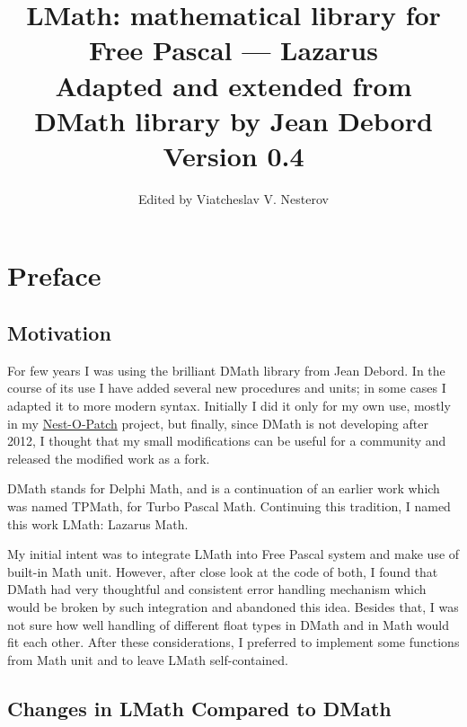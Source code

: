 \documentclass[12pt,a4paper,oneside]{report}
\begin{document}
\title{LMath: mathematical library for Free Pascal --- Lazarus\\
{\large Adapted and extended from DMath library by Jean Debord\\
Version 0.4}}

\author{Edited by Viatcheslav V. Nesterov}
\maketitle
\newpage
\label{toc}\tableofcontents
\newpage
\newlength{\tmplength}
\chapter*{Preface}
\section*{Motivation}
For few years I was using the brilliant DMath library from Jean Debord. In the course of its use I have added several new procedures and units; in some cases I adapted it to more modern syntax. Initially I did it only for my own use, mostly in my \href{https://sourceforge.net/projects/nestopatch/}{Nest-O-Patch} project, but finally, since DMath is not developing after 2012, I thought that my small modifications can be useful for a community and released the modified work as a fork. 

DMath stands for Delphi Math, and is a continuation of an earlier work which was named TPMath, for Turbo Pascal Math. Continuing this tradition, I named this work LMath: Lazarus Math.

My initial intent was to integrate LMath into Free Pascal system and make use of built-in Math unit. However, after close look at the code of both, I found that DMath had very thoughtful and consistent error handling mechanism which would be broken by such integration and abandoned this idea. Besides that, I was not sure how well handling of different float types in DMath and in Math would fit each other. After these considerations, I preferred to implement some functions from Math unit and to leave LMath self-contained.
\section*{Changes in LMath Compared to DMath}
\end{document}
